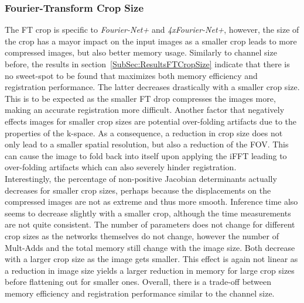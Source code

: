 \subsubsection{Fourier-Transform Crop Size} \label{SubSubSec:DiscussionFTCropSize}
The FT crop is specific to \emph{Fourier-Net+} and \emph{4xFourier-Net+}, however, the size of the crop has a mayor impact on the input images as a smaller crop leads to more compressed images, but also better memory usage. Similarly to channel size before, the results in section~\ref{SubSec:ResultsFTCropSize} indicate that there is no sweet-spot to be found that maximizes both memory efficiency and registration performance. The latter decreases drastically with a smaller crop size. This is to be expected as the smaller FT drop compresses the images more, making an accurate registration more difficult. Another factor that negatively effects images for smaller crop sizes are potential over-folding artifacts due to the properties of the k-space. As a consequence, a reduction in crop size does not only lead to a smaller spatial resolution, but also a reduction of the FOV. This can cause the image to fold back into itself upon applying the iFFT leading to over-folding artifacts which can also severely hinder registration. \\
Interestingly, the percentage of non-positive Jacobian determinants actually decreases for smaller crop sizes, perhaps because the displacements on the compressed images are not as extreme and thus more smooth. Inference time also seems to decrease slightly with a smaller crop, although the time measurements are not quite consistent. The number of parameters does not change for different crop sizes as the networks themselves do not change, however the number of Mult-Adds and the total memory still change with the image size. Both decrease with a larger crop size as the image gets smaller. This effect is again not linear as a reduction in image size yields a larger reduction in memory for large crop sizes before flattening out for smaller ones. Overall, there is a trade-off between memory efficiency and registration performance similar to the channel size.


